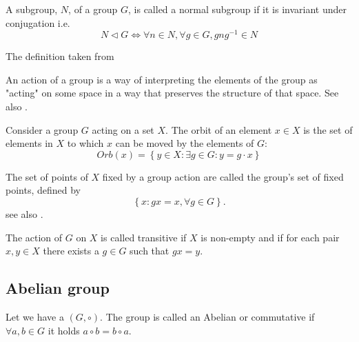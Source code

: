 \begin{appendices}
\begin{definition}
  A subgroup, $N$, of a group $G$, is called a normal subgroup if it
  is invariant under conjugation i.e. 
  \[
  N \triangleleft G \Leftrightarrow
  \forall n \in N, \forall g \in G, g n g^{-1} \in N
  \]
  
  The definition taken from \cite{wiki:normalsubgroup}
  \label{def:normalsubgroup}
\end{definition}

\begin{definition}[Action]
  An action of a group is a way of
  interpreting the elements of the 
  group as "acting" on some space in a way that preserves the structure
  of that space. See also \cite{wiki:groupaction}.
  \label{def:action}
\end{definition}

\begin{definition}[Orbit]
  Consider \cite{wiki:groupaction} a group $G$ acting on a set
  $X$. The orbit of an element $x \in X$ 
  is the set of elements in $X$ to which $x$ can be moved by the elements
  of $G$:
  \[
  Orb\left(x\right) = \left\{y \in X: \exists g \in G: y = g \cdot x \right\}
  \]
  \label{def:orbit}
\end{definition}

\begin{definition}
  The set of points of $X$ fixed by a group action are called the
  group's set of fixed points, defined by
  \[
  \left\{
  x: g x = x, \forall g \in G
  \right\}.
  \]
  see also \cite{mathworld:groupfixedpoint}. 
  \label{def:fixedpoint}
\end{definition}

\begin{definition}
  The action of $G$ on $X$ is called \cite{wiki:groupaction}
  transitive if $X$ is non-empty and if for each pair $x, y \in X$ there
  exists a $g \in G$ such that $gx = y$.
  \label{def:transitive}
\end{definition}

\subsection{Abelian group}

\begin{definition}
  Let we have a  $\left(G, \circ\right)$.
  The group is called an Abelian or commutative if
  $\forall a, b \in G$ it holds $a \circ b = b \circ a$.
  \label{def:abeliangroup}
\end{definition}


\end{appendices}
